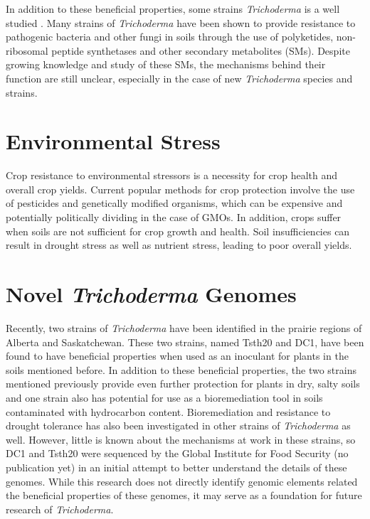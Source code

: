 In addition to these beneficial properties, some strains \textit{Trichoderma} is a
well studied . Many strains of \textit{Trichoderma} have been shown to
provide resistance to pathogenic bacteria and other fungi in soils
through the use of polyketides, non-ribosomal peptide synthetases and
other secondary metabolites\cite{Woo2023} (SMs). Despite growing
knowledge and study of these SMs, the mechanisms behind their function
are still unclear\cite{Baker2012}, especially in the case of new
\textit{Trichoderma} species and strains.

\section{Environmental Stress}

Crop resistance to environmental stressors is a necessity for crop
health and overall crop yields. Current popular methods for crop
protection involve the use of pesticides and genetically modified
organisms, which can be expensive and potentially politically dividing
in the case of GMOs\cite{doi:10.1080/10408390600762696}. In addition,
crops suffer when soils are not sufficient for crop growth and
health. Soil insufficiencies can result in drought stress as well as
nutrient stress, leading to poor overall yields.

\section{Novel \textit{Trichoderma} Genomes}

Recently, two strains of \textit{Trichoderma}
have been identified in the prairie regions of Alberta and
Saskatchewan. These two strains, named Tsth20 and DC1, have been found
to have beneficial properties when used as an inoculant for plants in
the soils mentioned before. In addition to these beneficial
properties, the two strains mentioned previously provide even further
protection for plants in dry, salty soils and one strain also has
potential for use as a bioremediation tool in soils contaminated with
hydrocarbon content. Bioremediation and resistance to drought
tolerance has also been investigated in other strains of
\textit{Trichoderma} as well\cite{10.3389/fpls.2023.1190304}. However,
little is known about the mechanisms at work in these strains, so DC1
and Tsth20 were sequenced by the Global Institute for Food Security
(no publication yet) in an initial attempt to better understand the
details of these genomes. While this research does not directly
identify genomic elements related the beneficial properties of these
genomes, it may serve as a foundation for future research of
\textit{Trichoderma}.

